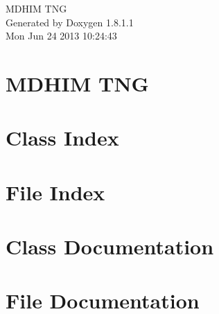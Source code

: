 \documentclass{book}
\begin{document}
\hypersetup{pageanchor=false,citecolor=blue}
\begin{titlepage}
\vspace*{7cm}
\begin{center}
{\Large M\-D\-H\-I\-M T\-N\-G }\\
\vspace*{1cm}
{\large Generated by Doxygen 1.8.1.1}\\
\vspace*{0.5cm}
{\small Mon Jun 24 2013 10:24:43}\\
\end{center}
\end{titlepage}
\clearemptydoublepage
{}
\tableofcontents
\clearemptydoublepage
{}
\hypersetup{pageanchor=true,citecolor=blue}
\chapter{M\-D\-H\-I\-M T\-N\-G}
\label{index}\hypertarget{index}{}
\chapter{Class Index}

\chapter{File Index}

\chapter{Class Documentation}























\chapter{File Documentation}
















\printindex
\end{document}
